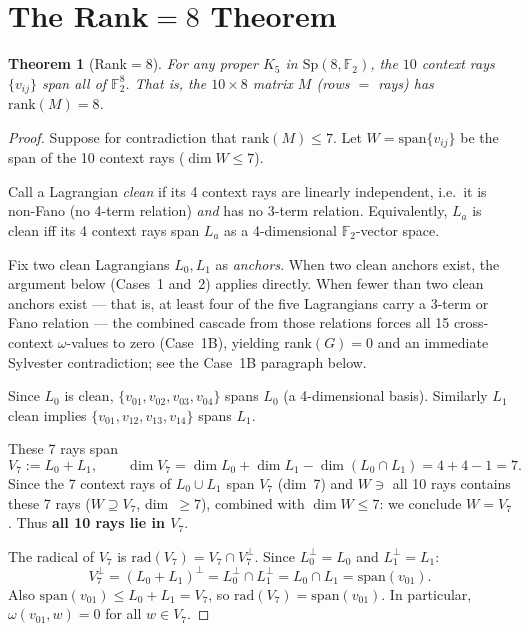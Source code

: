 \documentclass[11pt,a4paper]{article}
\newtheorem{theorem}{Theorem}[section]
\theoremstyle{remark}
\newcommand{\Sp}{\mathrm{Sp}}
\begin{document}
\appendix

\section{\texorpdfstring{The Rank$=8$ Theorem}{The Rank=8 Theorem}}\label{sec:rank8}

\begin{theorem}[Rank$=8$]\label{thm:rank8}
For any proper $K_5$ in $\Sp(8,\mathbb{F}_2)$,
the $10$ context rays $\{v_{ij}\}$ span all of $\mathbb{F}_2^8$.
That is, the $10 \times 8$ matrix $M$ (rows $= $ rays) has $\mathrm{rank}(M) = 8$.
\end{theorem}

\begin{proof}
Suppose for contradiction that $\mathrm{rank}(M) \leq 7$.
Let $W = \mathrm{span}\{v_{ij}\}$ be the span of the 10 context rays ($\dim W \leq 7$).

Call a Lagrangian \emph{clean} if its 4 context rays are linearly independent,
i.e.\ it is non-Fano (no 4-term relation) \emph{and} has no 3-term relation.
Equivalently, $L_a$ is clean iff its 4 context rays span $L_a$ as a 4-dimensional
$\mathbb{F}_2$-vector space.

Fix two clean Lagrangians $L_0, L_1$ as \emph{anchors}.
When two clean anchors exist, the argument below (Cases~1 and~2) applies directly.
When fewer than two clean anchors exist — that is, at least four of the five Lagrangians carry
a 3-term or Fano relation — the combined cascade from those relations forces all 15 cross-context
$\omega$-values to zero (Case~1B), yielding rank$(G)=0$ and an immediate Sylvester
contradiction; see the Case~1B paragraph below.

Since $L_0$ is clean, $\{v_{01}, v_{02}, v_{03}, v_{04}\}$ spans $L_0$ (a 4-dimensional basis).
Similarly $L_1$ clean implies $\{v_{01}, v_{12}, v_{13}, v_{14}\}$ spans $L_1$.

These 7 rays span
\[
  V_7 := L_0 + L_1, \qquad \dim V_7 = \dim L_0 + \dim L_1 - \dim(L_0 \cap L_1) = 4+4-1 = 7.
\]
Since the 7 context rays of $L_0 \cup L_1$ span $V_7$ (dim~7) and
$W \ni $ all 10 rays contains these 7 rays ($W \supseteq V_7$, dim~$\geq 7$),
combined with $\dim W \leq 7$: we conclude $W = V_7$.
Thus \textbf{all 10 rays lie in $V_7$}.

The radical of $V_7$ is $\mathrm{rad}(V_7) = V_7 \cap V_7^\perp$.
Since $L_0^\perp = L_0$ and $L_1^\perp = L_1$:
\[
  V_7^\perp = (L_0 + L_1)^\perp = L_0^\perp \cap L_1^\perp = L_0 \cap L_1 = \mathrm{span}(v_{01}).
\]
Also $\mathrm{span}(v_{01}) \leq L_0 + L_1 = V_7$, so
$\mathrm{rad}(V_7) = \mathrm{span}(v_{01})$.
In particular, $\omega(v_{01}, w) = 0$ for all $w \in V_7$.


\end{proof}
\end{document}
